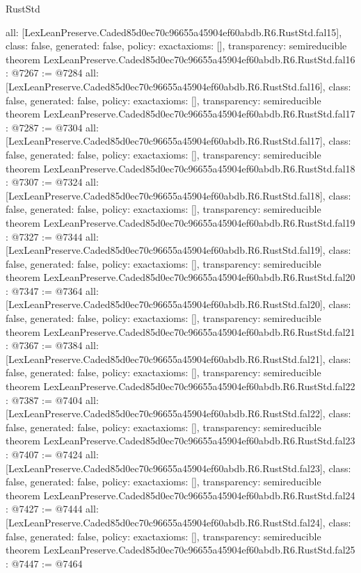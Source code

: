 \begin{lexlean}{RustStd}
\begin{coremodule}
{  all: [LexLeanPreserve.Caded85d0ec70c96655a45904ef60abdb.R6.RustStd.fal15],
  class: false,
  generated: false,
  policy: exact{axioms: []},
  transparency: semireducible
}
theorem LexLeanPreserve.Caded85d0ec70c96655a45904ef60abdb.R6.RustStd.fal16 : @7267 := @7284 {
  all: [LexLeanPreserve.Caded85d0ec70c96655a45904ef60abdb.R6.RustStd.fal16],
  class: false,
  generated: false,
  policy: exact{axioms: []},
  transparency: semireducible
}
theorem LexLeanPreserve.Caded85d0ec70c96655a45904ef60abdb.R6.RustStd.fal17 : @7287 := @7304 {
  all: [LexLeanPreserve.Caded85d0ec70c96655a45904ef60abdb.R6.RustStd.fal17],
  class: false,
  generated: false,
  policy: exact{axioms: []},
  transparency: semireducible
}
theorem LexLeanPreserve.Caded85d0ec70c96655a45904ef60abdb.R6.RustStd.fal18 : @7307 := @7324 {
  all: [LexLeanPreserve.Caded85d0ec70c96655a45904ef60abdb.R6.RustStd.fal18],
  class: false,
  generated: false,
  policy: exact{axioms: []},
  transparency: semireducible
}
theorem LexLeanPreserve.Caded85d0ec70c96655a45904ef60abdb.R6.RustStd.fal19 : @7327 := @7344 {
  all: [LexLeanPreserve.Caded85d0ec70c96655a45904ef60abdb.R6.RustStd.fal19],
  class: false,
  generated: false,
  policy: exact{axioms: []},
  transparency: semireducible
}
theorem LexLeanPreserve.Caded85d0ec70c96655a45904ef60abdb.R6.RustStd.fal20 : @7347 := @7364 {
  all: [LexLeanPreserve.Caded85d0ec70c96655a45904ef60abdb.R6.RustStd.fal20],
  class: false,
  generated: false,
  policy: exact{axioms: []},
  transparency: semireducible
}
theorem LexLeanPreserve.Caded85d0ec70c96655a45904ef60abdb.R6.RustStd.fal21 : @7367 := @7384 {
  all: [LexLeanPreserve.Caded85d0ec70c96655a45904ef60abdb.R6.RustStd.fal21],
  class: false,
  generated: false,
  policy: exact{axioms: []},
  transparency: semireducible
}
theorem LexLeanPreserve.Caded85d0ec70c96655a45904ef60abdb.R6.RustStd.fal22 : @7387 := @7404 {
  all: [LexLeanPreserve.Caded85d0ec70c96655a45904ef60abdb.R6.RustStd.fal22],
  class: false,
  generated: false,
  policy: exact{axioms: []},
  transparency: semireducible
}
theorem LexLeanPreserve.Caded85d0ec70c96655a45904ef60abdb.R6.RustStd.fal23 : @7407 := @7424 {
  all: [LexLeanPreserve.Caded85d0ec70c96655a45904ef60abdb.R6.RustStd.fal23],
  class: false,
  generated: false,
  policy: exact{axioms: []},
  transparency: semireducible
}
theorem LexLeanPreserve.Caded85d0ec70c96655a45904ef60abdb.R6.RustStd.fal24 : @7427 := @7444 {
  all: [LexLeanPreserve.Caded85d0ec70c96655a45904ef60abdb.R6.RustStd.fal24],
  class: false,
  generated: false,
  policy: exact{axioms: []},
  transparency: semireducible
}
theorem LexLeanPreserve.Caded85d0ec70c96655a45904ef60abdb.R6.RustStd.fal25 : @7447 := @7464 {
}
\end{coremodule}
\end{lexlean}
